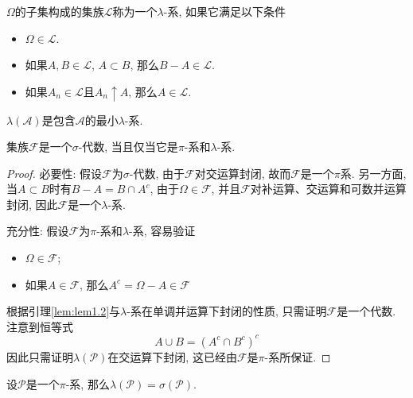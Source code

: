 \documentclass[cn, 12pt, math=mtpro2, bibstyle=apa, blue, twocol]{elegantbook}
\newcommand{\F}{\mathcal{F}}
\begin{document}
\begin{definition}
$\Omega$的子集构成的集族$\mathcal{L}$称为一个$\lambda$-系, 如果它满足以下条件
\begin{itemize}
  \item $\Omega\in\mathcal{L}$.
  \item 如果$A,B\in\mathcal{L}$, $A\subset B$, 那么$B-A\in\mathcal{L}$.
  \item 如果$A_n\in\mathcal{L}$且$A_n\uparrow A$, 那么$A\in\mathcal{L}$.
\end{itemize}
$\lambda(\mathcal{A})$是包含$\mathcal{A}$的最小$\lambda$-系.
\end{definition}
\begin{example}
集族$\F$是一个$\sigma$-代数, 当且仅当它是$\pi$-系和$\lambda$-系.
\end{example}
\begin{proof}
  必要性: 假设$\F$为$\sigma$-代数, 由于$\F$对交运算封闭, 故而$\F$是一个$\pi$系. 另一方面, 当$A\subset B$时有$B-A=B\cap A^c$, 由于$\Omega\in\F$, 并且$\F$对补运算、交运算和可数并运算封闭, 因此$\F$是一个$\lambda$-系.

  充分性: 假设$\F$为$\pi$-系和$\lambda$-系, 容易验证
  \begin{itemize}
    \item $\Omega\in\F$;
    \item 如果$A\in\F$, 那么$A^c=\Omega-A\in\F$
  \end{itemize}
  根据引理\ref{lem:lem1.2}与$\lambda$-系在单调并运算下封闭的性质, 只需证明$\F$是一个代数. 注意到恒等式
  $$A\cup B=(A^c\cap B^c)^c$$
  因此只需证明$\lambda(\mathcal{P})$在交运算下封闭, 这已经由$\F$是$\pi$-系所保证.
\end{proof}
\begin{theorem}[$\pi-\lambda$定理]
  设$\mathcal{P}$是一个$\pi$-系, 那么$\lambda(\mathcal{P})=\sigma(\mathcal{P})$.
\end{theorem}
\end{document}
